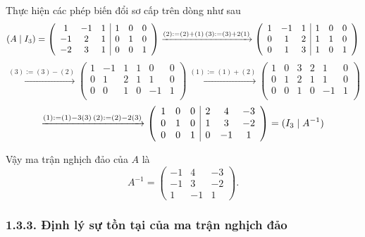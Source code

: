Thực hiện các phép biến đổi sơ cấp trên dòng như sau
\[
\left( A \mid I_3 \right) = \left( \begin{array}{ccc|ccc}
1 & -1 & 1 & 1 & 0 & 0 \\
-1 & 2 & 1 & 0 & 1 & 0 \\
-2 & 3 & 1 & 0 & 0 & 1 \\
\end{array} \right)
\xrightarrow{(2) := (2) + (1) \\ (3) := (3) + 2(1)}
\left( \begin{array}{ccc|ccc}
1 & -1 & 1 & 1 & 0 & 0 \\
0 & 1 & 2 & 1 & 1 & 0 \\
0 & 1 & 3 & 1 & 0 & 1 \\
\end{array} \right)
\]
\[
\xrightarrow{(3) := (3) - (2)}
\left( \begin{array}{ccc|ccc}
1 & -1 & 1 & 1 & 0 & 0 \\
0 & 1 & 2 & 1 & 1 & 0 \\
0 & 0 & 1 & 0 & -1 & 1 \\
\end{array} \right)
\xrightarrow{(1) := (1) + (2)}
\left( \begin{array}{ccc|ccc}
1 & 0 & 3 & 2 & 1 & 0 \\
0 & 1 & 2 & 1 & 1 & 0 \\
0 & 0 & 1 & 0 & -1 & 1 \\
\end{array} \right)
\]
\[
\xrightarrow{(1) := (1) - 3(3) \\ (2) := (2) - 2(3)}
\left( \begin{array}{ccc|ccc}
1 & 0 & 0 & 2 & 4 & -3 \\
0 & 1 & 0 & 1 & 3 & -2 \\
0 & 0 & 1 & 0 & -1 & 1 \\
\end{array} \right) = (I_3 \mid A^{-1})
\]

Vậy ma trận nghịch đảo của \(A\) là
\[
A^{-1} = \begin{pmatrix}
-1 & 4 & -3 \\
-1 & 3 & -2 \\
1 & -1 & 1
\end{pmatrix}.
\]

\subsubsection*{1.3.3. Định lý sự tồn tại của ma trận nghịch đảo}

